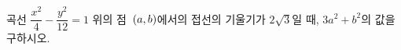 곡선 $\dfrac{x^2}{4}-\dfrac{y^2}{12}=1$ 위의 점~$(a{,}\mkern3mu\mathopen{}b)$에서의 접선의 기울기가 $2\sqrt{3}$일 때, $3a^2+b^2$의 값을 구하시오. 
